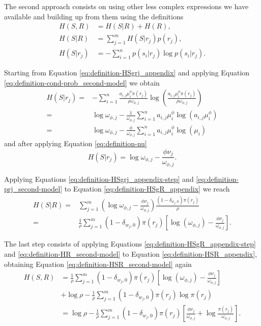 The second approach consists on using other less complex expressions we have available and building up from them using the definitions
\begin{align}
  \label{eq:definition-HSR_appendix}
  H(S,R) &= H(S|R) + H(R), \\
  \label{eq:definition-HSgR_appendix}
  H(S|R) &= \sum_{j=1}^m H(S|r_j)p(r_j), \\
  \label{eq:definition-HSgrj_appendix}
  H(S|r_j) &= -\sum_{i=1}^n p(s_i|r_j) \log p(s_i|r_j).
\end{align}

Starting from Equation \eqref{eq:definition-HSgrj_appendix} and applying Equation \eqref{eq:definition-cond-prob_second-model} we obtain
\begin{align*}
  H(S|r_j) =& -\sum_{i=1}^n \frac{a_{i,j} \mu_i^\phi \pi(r_j)}{\rho \omega_{\phi,j}} \log \left( \frac{a_{i,j} \mu_i^\phi \pi(r_j)}{\rho \omega_{\phi,j}} \right) \\
           =& \log \omega_{\phi,j} - \frac{1}{\omega_{\phi,j}} \sum_{i=1}^n a_{i,j} \mu_i^\phi \log(a_{i,j} \mu_i^\phi) \\
           =& \log \omega_{\phi,j} - \frac{\phi}{\omega_{\phi,j}} \sum_{i=1}^n a_{i,j} \mu_i^\phi \log(\mu_i)
\end{align*}
and after applying Equation \eqref{eq:definition-nu}
\begin{equation}
  \label{eq:definition-HSgrj_appendix-step}
  H(S|r_j) = \log \omega_{\phi,j} - \frac{\phi \nu_j}{\omega_{\phi,j}}.
\end{equation}

Applying Equations \eqref{eq:definition-HSgrj_appendix-step} and \eqref{eq:definition-prj_second-model} to Equation \eqref{eq:definition-HSgR_appendix} we reach
\begin{align}
  H(S|R) =& \sum_{j=1}^m \left(\log \omega_{\phi,j} - \frac{\phi \nu_j}{\omega_{\phi,j}}\right) \frac{(1 - \delta_{w_j,0}) \pi(r_j)}{\rho} \nonumber \\
  \label{eq:definition-HSgR_appendix-step}
       =& \frac{1}{\rho} \sum_{j=1}^m (1 - \delta_{w_j,0}) \pi(r_j) \left[ \log(\omega_{\phi,j}) - \frac{\phi \nu_j}{\omega_{\phi,j}} \right].
\end{align}

The last step consists of applying Equations \eqref{eq:definition-HSgR_appendix-step} and \eqref{eq:definition-HR_second-model} to Equation \eqref{eq:definition-HSR_appendix}, obtaining Equation \eqref{eq:definition-HSR_second-model} again
\begin{align*}
  H(S,R) &= \frac{1}{\rho} \sum_{j=1}^m (1 - \delta_{w_j,0}) \pi(r_j) \left[ \log(\omega_{\phi,j}) - \frac{\phi \nu_j}{\omega_{\phi,j}} \right] \\
       &+ \log \rho - \frac{1}{\rho} \sum_{j=1}^m (1 - \delta_{w_j,0}) \pi(r_j) \log \pi(r_j) \\
       &= \log \rho - \frac{1}{\rho} \sum_{j=1}^m (1 - \delta_{w_j,0}) \pi(r_j) \left[ \frac{\phi \nu_j}{\omega_{\phi,j}} + \log \frac{\pi(r_j)}{\omega_{\phi,j}} \right].
\end{align*}

